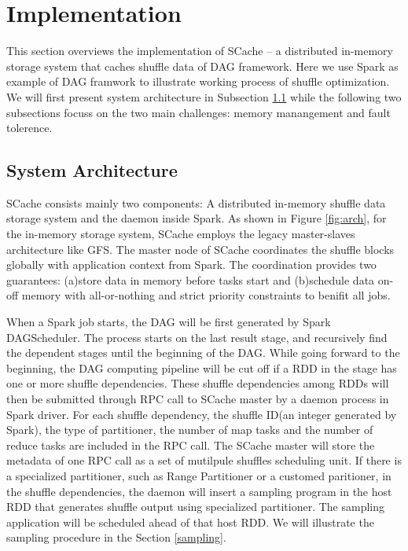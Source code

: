\documentclass[10pt,twocolumn]{article}
\begin{document}
\section{Implementation}\label{impl}
This section overviews the implementation of SCache -- a distributed in-memory storage system that caches shuffle data of DAG framework. Here we use Spark as example of DAG framwork to illustrate working process of shuffle optimization. We will first present system architecture in Subsection \ref{arch} while the following two subsections focuss on the two main challenges: memory manangement and fault tolerence.

\subsection{System Architecture}\label{arch}
SCache consists mainly two components: A distributed in-memory shuffle data storage system and the daemon inside Spark. As shown in Figure \ref{fig:arch}, for the in-memory storage system, SCache employs the legacy master-slaves architecture like GFS\cite{gfs}. The master node of SCache coordinates the shuffle blocks globally with application context from Spark. The coordination provides two guarantees: (a)store data in memory before tasks start and (b)schedule data on-off memory with all-or-nothing and strict priority constraints to benifit all jobs. 

When a Spark job starts, the DAG will be first generated by Spark DAGScheduler\cite{sparksource}. The process starts on the last result stage, and recursively find the dependent stages until the beginning of the DAG. While going forward to the beginning, the DAG computing pipeline will be cut off if a RDD in the stage has one or more shuffle dependencies. These shuffle dependencies among RDDs will then be submitted through RPC call to SCache master by a daemon process in Spark driver. For each shuffle dependency, the shuffle ID(an integer generated by Spark), the type of partitioner, the number of map tasks and the number of reduce tasks are included in the RPC call. The SCache master will store the metadata of one RPC call as a set of mutilpule shuffles scheduling unit. If there is a specialized partitioner, such as Range Partitioner or a customed paritioner, in the shuffle dependencies, the daemon will insert a sampling program in the host RDD that generates shuffle output using specialized partitioner. The sampling application will be scheduled ahead of that host RDD. We will illustrate the sampling procedure in the Section \ref{sampling}.
\end{document}
